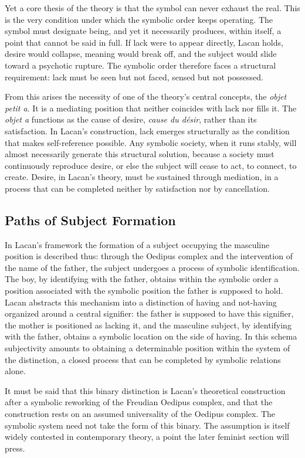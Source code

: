 Yet a core thesis of the theory is that the symbol can never exhaust the real. This is the very condition under which the symbolic order keeps operating. The symbol must designate being, and yet it necessarily produces, within itself, a point that cannot be said in full. If lack were to appear directly, Lacan holds, desire would collapse, meaning would break off, and the subject would slide toward a psychotic rupture. The symbolic order therefore faces a structural requirement: lack must be seen but not faced, sensed but not possessed.

From this arises the necessity of one of the theory's central concepts, the \textit{objet petit a}. It is a mediating position that neither coincides with lack nor fills it. The \textit{objet a} functions as the cause of desire, \textit{cause du désir}, rather than its satisfaction. In Lacan's construction, lack emerges structurally as the condition that makes self-reference possible. Any symbolic society, when it runs stably, will almost necessarily generate this structural solution, because a society must continuously reproduce desire, or else the subject will cease to act, to connect, to create. Desire, in Lacan's theory, must be sustained through mediation, in a process that can be completed neither by satisfaction nor by cancellation.

\subsection{Paths of Subject Formation}

In Lacan's framework the formation of a subject occupying the masculine position is described thus: through the Oedipus complex and the intervention of the name of the father, the subject undergoes a process of symbolic identification. The boy, by identifying with the father, obtains within the symbolic order a position associated with the symbolic position the father is supposed to hold. Lacan abstracts this mechanism into a distinction of having and not-having organized around a central signifier: the father is supposed to have this signifier, the mother is positioned as lacking it, and the masculine subject, by identifying with the father, obtains a symbolic location on the side of having. In this schema subjectivity amounts to obtaining a determinable position within the system of the distinction, a closed process that can be completed by symbolic relations alone.

It must be said that this binary distinction is Lacan's theoretical construction after a symbolic reworking of the Freudian Oedipus complex, and that the construction rests on an assumed universality of the Oedipus complex. The symbolic system need not take the form of this binary. The assumption is itself widely contested in contemporary theory, a point the later feminist section will press.


